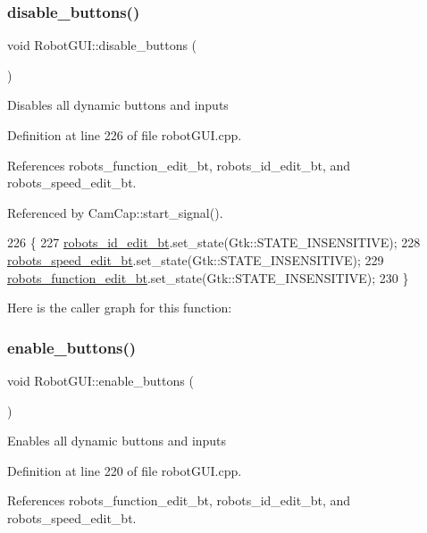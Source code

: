 \subsubsection{\texorpdfstring{disable\+\_\+buttons()}{disable\_buttons()}}
{\footnotesize\ttfamily void Robot\+G\+U\+I\+::disable\+\_\+buttons (\begin{DoxyParamCaption}{ }\end{DoxyParamCaption})}

Disables all dynamic buttons and inputs 

Definition at line 226 of file robot\+G\+U\+I.\+cpp.



References robots\+\_\+function\+\_\+edit\+\_\+bt, robots\+\_\+id\+\_\+edit\+\_\+bt, and robots\+\_\+speed\+\_\+edit\+\_\+bt.



Referenced by Cam\+Cap\+::start\+\_\+signal().


\begin{DoxyCode}
226                                \{
227     \hyperlink{class_robot_g_u_i_aa74c3aa318e937124b6bd8cc1139ffbd}{robots\_id\_edit\_bt}.set\_state(Gtk::STATE\_INSENSITIVE);
228     \hyperlink{class_robot_g_u_i_aeb9008eb20d42d90fe39564179598d6d}{robots\_speed\_edit\_bt}.set\_state(Gtk::STATE\_INSENSITIVE);
229     \hyperlink{class_robot_g_u_i_ac474c7d61bd07aaf26f75acb691e2971}{robots\_function\_edit\_bt}.set\_state(Gtk::STATE\_INSENSITIVE);
230 \}
\end{DoxyCode}
Here is the caller graph for this function\+:
\mbox{\label{class_robot_g_u_i_a01f52178c89f4bbb7b0c5ba4c1b709d0}} 
\subsubsection{\texorpdfstring{enable\+\_\+buttons()}{enable\_buttons()}}
{\footnotesize\ttfamily void Robot\+G\+U\+I\+::enable\+\_\+buttons (\begin{DoxyParamCaption}{ }\end{DoxyParamCaption})}

Enables all dynamic buttons and inputs 

Definition at line 220 of file robot\+G\+U\+I.\+cpp.



References robots\+\_\+function\+\_\+edit\+\_\+bt, robots\+\_\+id\+\_\+edit\+\_\+bt, and robots\+\_\+speed\+\_\+edit\+\_\+bt.



